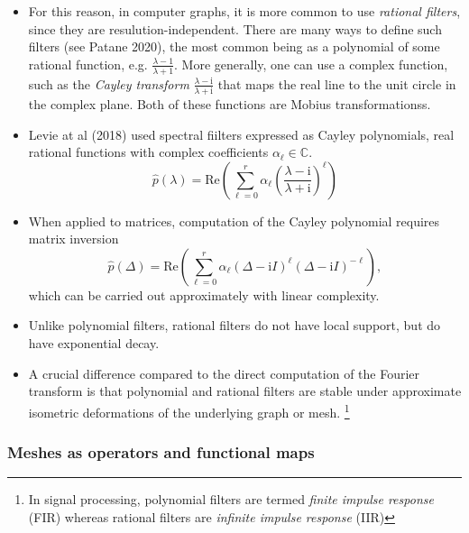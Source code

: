 \documentclass[12pt]{article}
\numberwithin{equation}{section}
\theoremstyle{definition}
\newcommand{		\1		}	{	\bm{1}					}%
\begin{document}
\begin{itemize}
\item For this reason, in computer graphs, it is more common to use \emph{ rational filters}, since they are resulution-independent. There are many ways to define such filters (see Patane 2020), the most common being as a polynomial of some rational function, e.g. $\frac{\lambda-1}{\lambda+1}$. More generally, one can use a complex function, such as the \emph{Cayley transform} $\frac{\lambda - \textrm{i}}{\lambda + \textrm{i}}$ that maps the real line to the unit circle in the complex plane. Both of these functions are Mobius transformationss.
\item Levie at al (2018) used spectral fiilters expressed as Cayley polynomials, real rational functions with complex coefficients $\alpha_\ell \in \mathbb{C}$. 
$$
\hat{p} ( \lambda) 
	= \textrm{Re} 
	\left(  
		\sum_{\ell = 0}^r 
			\alpha_\ell 
			\left(
			\frac{ \lambda - \textrm{i} }{ \lambda + \textrm{i}  }
			\right)^\ell 
	\right)
$$
\item When applied to matrices, computation of the Cayley polynomial requires matrix inversion 
$$
\hat{p} (\Delta) = \textrm{Re} \left( \sum_{ \ell = 0}^r \alpha_\ell (\Delta - \textrm{i} I ) ^\ell (\Delta - \textrm{i} I )^{-\ell} \right),
$$
which can be carried out approximately with linear complexity. 
\item Unlike polynomial filters, rational filters do not have local support, but do have exponential decay. 
\item A crucial difference compared to the direct computation of the Fourier transform is that polynomial and rational filters are stable under approximate isometric deformations of the underlying graph or mesh. \footnote{In signal processing, polynomial filters are termed \emph{finite impulse response} (FIR) whereas rational filters are \emph{infinite impulse response} (IIR)}
\end{itemize}

\subsubsection*{ Meshes as operators and functional maps } 
\end{document}
